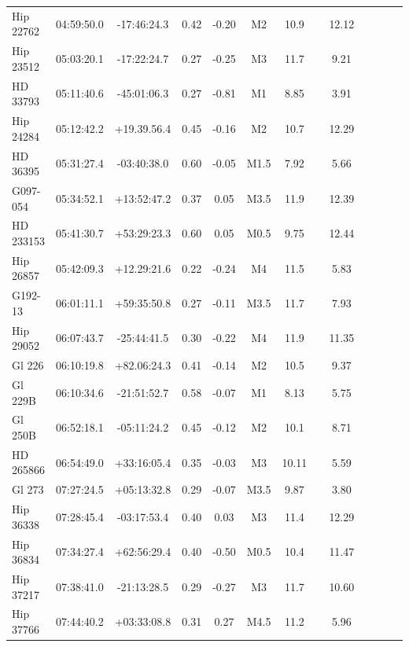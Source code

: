 \begin{landscape}
{\begin{longtable}{l|cccccccccccc}
  Hip 22762 & 04:59:50.0 & -17:46:24.3 & 0.42 & -0.20 & M2 & 10.9 & \citet{Koen10} & 12.12  \\ 
  Hip 23512 & 05:03:20.1 & -17:22:24.7 & 0.27 & -0.25 & M3 & 11.7 & \citet{Koen10} & 9.21   \\
    HD 33793 & 05:11:40.6 & -45:01:06.3 & 0.27 & -0.81 & M1 &  8.85 & \citet{Koen10} &  3.91   \\ 
 Hip 24284 & 05:12:42.2 & +19.39.56.4 & 0.45 & -0.16 & M2 & 10.7 & \citet{Koen10} & 12.29  \\ 
    HD 36395 & 05:31:27.4 & -03:40:38.0 &  0.60 & -0.05 & M1.5 &  7.92 & \citet{Koen10} & 5.66  \\ 
  G097-054 & 05:34:52.1 & +13:52:47.2 & 0.37 & 0.05 & M3.5 &  11.9  & \citet{Kharchenko01} &  12.39  \\ 
  HD 233153 & 05:41:30.7 & +53:29:23.3 & 0.60 & 0.05 & M0.5 &  9.75 & \citet{Gliese91} & 12.44  \\
  Hip 26857 & 05:42:09.3 & +12.29:21.6 & 0.22 & -0.24 & M4 & 11.5 & \citet{Landolt92} & 5.83    \\
   G192-13 & 06:01:11.1 & +59:35:50.8 &  0.27 & -0.11 & M3.5 &  11.7 & \citet{VanAltena95} &  7.93   \\ 
  Hip 29052 & 06:07:43.7 & -25:44:41.5 & 0.30 & -0.22 & M4 & 11.9 & \citet{Koen10} & 11.35   \\ 
     Gl 226 & 06:10:19.8 & +82.06:24.3 & 0.41 & -0.14 & M2 & 10.5 & \citet{Gliese91} & 9.37   \\ 
     Gl 229B & 06:10:34.6 & -21:51:52.7 & 0.58 & -0.07 & M1 & 8.13 & \citet{Koen10} &  5.75  \\
    Gl 250B & 06:52:18.1 & -05:11:24.2 & 0.45 & -0.12 & M2 & 10.1 & \citet{Gliese91}  &  8.71  \\
    HD 265866 & 06:54:49.0 & +33:16:05.4 & 0.35 & -0.03 & M3 & 10.11 & \citet{Hog00} &  5.59  \\ 
     Gl 273 & 07:27:24.5 & +05:13:32.8 & 0.29 & -0.07 & M3.5 & 9.87 & \citet{Koen10} &  3.80   \\ 
  Hip 36338 & 07:28:45.4 & -03:17:53.4 & 0.40 & 0.03 & M3 & 11.4 & \citet{Koen10} & 12.29 \\ 
  Hip 36834 & 07:34:27.4 & +62:56:29.4 & 0.40 & -0.50 & M0.5 & 10.4 & \citet{Hog00} & 11.47   \\ 
 Hip 37217 & 07:38:41.0 & -21:13:28.5 & 0.29 & -0.27 & M3 & 11.7 & \citet{Koen10} & 10.60   \\
  Hip 37766 & 07:44:40.2 & +03:33:08.8 & 0.31 & 0.27 & M4.5 & 11.2 & \citet{Koen10} & 5.96  \\

\end{longtable}}
\end{landscape}
